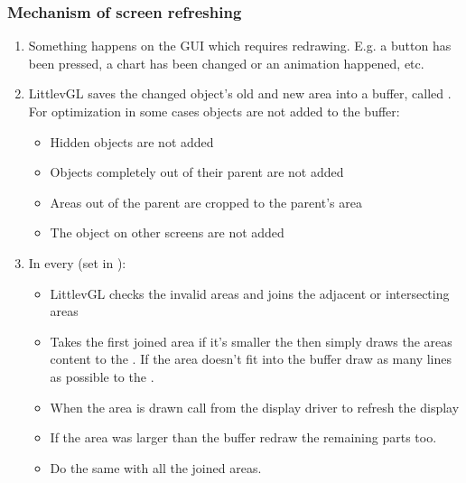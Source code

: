 \documentclass[letterpaper,10pt,english]{sphinxmanual}
\begin{document}
\subsubsection{Mechanism of screen refreshing}
\label{\detokenize{overview/drawing:mechanism-of-screen-refreshing}}\begin{enumerate}
\def\theenumi{\arabic{enumi}}
\def\labelenumi{\theenumi .}
\makeatletter\def\p@enumii{\p@enumi \theenumi .}\makeatother
\item {} 
Something happens on the GUI which requires redrawing. E.g. a button has been pressed, a chart has been changed or an animation happened, etc.

\item {} 
LittlevGL saves the changed object’s old and new area into a buffer, called . For optimization in some cases objects are not added to the buffer:
\begin{itemize}
\item {} 
Hidden objects are not added

\item {} 
Objects completely out of their parent are not added

\item {} 
Areas out of the parent are cropped to the parent’s area

\item {} 
The object on other screens are not added

\end{itemize}

\item {} 
In every  (set in ):
\begin{itemize}
\item {} 
LittlevGL checks the invalid areas and joins the adjacent or intersecting areas

\item {} 
Takes the first joined area if it’s smaller the  then simply draws the areas content to the . If the area doesn’t fit into the buffer draw as many lines as possible to the .

\item {} 
When the area is drawn call  from the display driver to refresh the display

\item {} 
If the area was larger than the buffer redraw the remaining parts too.

\item {} 
Do the same with all the joined areas.

\end{itemize}

\end{enumerate}
\end{document}

